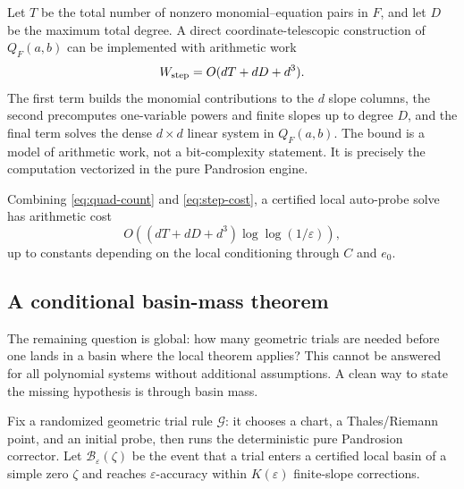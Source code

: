 \documentclass[11pt]{article}
\theoremstyle{definition}
\theoremstyle{remark}
\newcommand{\zetaRoot}{\zeta}
\begin{document}
Let $T$ be the total number of nonzero monomial--equation pairs in $F$, and let $D$ be the maximum total degree.  A direct coordinate-telescopic construction of $Q_F(a,b)$ can be implemented with arithmetic work
\begin{equation}\label{eq:step-cost}
        W_{\rm step}=O(dT+dD+d^3).
\end{equation}
The first term builds the monomial contributions to the $d$ slope columns, the second precomputes one-variable powers and finite slopes up to degree $D$, and the final term solves the dense $d\times d$ linear system in $Q_F(a,b)$.  The bound is a model of arithmetic work, not a bit-complexity statement.  It is precisely the computation vectorized in the pure Pandrosion engine.

Combining \eqref{eq:quad-count} and \eqref{eq:step-cost}, a certified local auto-probe solve has arithmetic cost
\begin{equation}\label{eq:local-work}
        O\left((dT+dD+d^3)\log\log(1/\varepsilon)\right),
\end{equation}
up to constants depending on the local conditioning through $C$ and $e_0$.

\subsection{A conditional basin-mass theorem}

The remaining question is global: how many geometric trials are needed before one lands in a basin where the local theorem applies?  This cannot be answered for all polynomial systems without additional assumptions.  A clean way to state the missing hypothesis is through basin mass.

Fix a randomized geometric trial rule $\mathcal{G}$: it chooses a chart, a Thales/Riemann point, and an initial probe, then runs the deterministic pure Pandrosion corrector.  Let $\mathcal{B}_{\varepsilon}(\zetaRoot)$ be the event that a trial enters a certified local basin of a simple zero $\zetaRoot$ and reaches $\varepsilon$-accuracy within $K(\varepsilon)$ finite-slope corrections.
\end{document}
